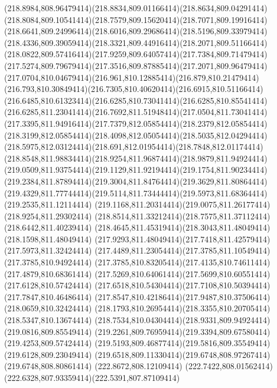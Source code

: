 {{	\curveto(218.8984,808.96479414)(218.8834,809.01166414)(218.8634,809.04291414)
	\curveto(218.8084,809.10541414)(218.7579,809.15620414)(218.7071,809.19916414)
	\curveto(218.6641,809.24996414)(218.6016,809.29686414)(218.5196,809.33979414)
	\curveto(218.4336,809.39059414)(218.3321,809.44916414)(218.2071,809.51166414)
	\curveto(218.0822,809.57416414)(217.9259,809.64057414)(217.7384,809.71479414)
	\curveto(217.5274,809.79679414)(217.3516,809.87885414)(217.2071,809.96479414)
	\curveto(217.0704,810.04679414)(216.961,810.12885414)(216.879,810.21479414)
	\curveto(216.793,810.30849414)(216.7305,810.40620414)(216.6915,810.51166414)
	\curveto(216.6485,810.61323414)(216.6285,810.73041414)(216.6285,810.85541414)
	\curveto(216.6285,811.23041414)(216.7692,811.51948414)(217.0504,811.73041414)
	\curveto(217.3395,811.94916414)(217.7379,812.05854414)(218.2379,812.05854414)
	\curveto(218.3199,812.05854414)(218.4098,812.05054414)(218.5035,812.04294414)
	\curveto(218.5975,812.03124414)(218.691,812.01954414)(218.7848,812.01174414)
	\curveto(218.8548,811.98834414)(218.9254,811.96874414)(218.9879,811.94924414)
	\curveto(219.0509,811.93754414)(219.1129,811.92194414)(219.1754,811.90234414)
	\curveto(219.2384,811.87894414)(219.3004,811.84764414)(219.3629,811.80864414)
	\curveto(219.4329,811.77744414)(219.5114,811.73444414)(219.5973,811.68364414)
	\lineto(219.2535,811.12114414)
	\curveto(219.1168,811.20314414)(219.0075,811.26177414)(218.9254,811.29302414)
	\curveto(218.8514,811.33212414)(218.7575,811.37112414)(218.6442,811.40239414)
	\curveto(218.4645,811.45319414)(218.3043,811.48049414)(218.1598,811.48049414)
	\curveto(217.9293,811.48049414)(217.7418,811.42579414)(217.5973,811.32424414)
	\curveto(217.4489,811.23054414)(217.3785,811.10549414)(217.3785,810.94924414)
	\curveto(217.3785,810.83205414)(217.4135,810.74611414)(217.4879,810.68361414)
	\curveto(217.5269,810.64061414)(217.5699,810.60551414)(217.6128,810.57424414)
	\curveto(217.6518,810.54304414)(217.7108,810.50394414)(217.7847,810.46486414)
	\curveto(217.8547,810.42186414)(217.9487,810.37506414)(218.0659,810.32424414)
	\curveto(218.1793,810.26954414)(218.3355,810.20705414)(218.5347,810.13674414)
	\curveto(218.7534,810.04304414)(218.9331,809.94924414)(219.0816,809.85549414)
	\curveto(219.2261,809.76959414)(219.3394,809.67580414)(219.4253,809.57424414)
	\curveto(219.5193,809.46877414)(219.5816,809.35549414)(219.6128,809.23049414)
	\curveto(219.6518,809.11330414)(219.6748,808.97267414)(219.6748,808.80861414)
	\closepath
	\moveto(222.8672,808.12109414)
	\curveto(222.7422,808.01562414)(222.6328,807.93359414)(222.5391,807.87109414)
}}

